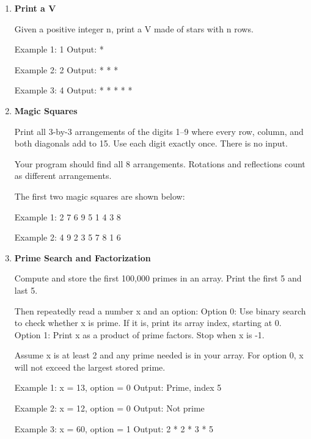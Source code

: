 \begin{enumerate}
\item \textbf{Print a V}

Given a positive integer n, print a V made of stars with n rows.

\begin{console}
Example 1: 1
Output:
*

Example 2: 2
Output:
*   *
  *
  
Example 3: 4
Output:
*     *
 *   *
   *
\end{console}\newpage

\item \textbf{Magic Squares}

Print all 3-by-3 arrangements of the digits 1–9 where every row, column, and both diagonals add to 15. Use each digit exactly once. There is no input.

Your program should find all 8 arrangements. Rotations and reflections count as different arrangements.

The first two magic squares are shown below:
\begin{console}
Example 1:
2 7 6
9 5 1
4 3 8

Example 2:
4 9 2
3 5 7
8 1 6
\end{console}\newpage

\item \textbf{Prime Search and Factorization}

Compute and store the first 100,000 primes in an array. Print the first 5 and last 5.

Then repeatedly read a number x and an option:
Option 0: Use binary search to check whether x is prime. If it is, print its array index, starting at 0.
Option 1: Print x as a product of prime factors.
Stop when x is -1.

Assume x is at least 2 and any prime needed is in your array. For option 0, x will not exceed the largest stored prime.

\begin{console}
Example 1: x = 13, option = 0
Output:    Prime, index 5

Example 2: x = 12, option = 0
Output:    Not prime

Example 3: x = 60, option = 1
Output:    2 * 2 * 3 * 5
\end{console}\newpage



\end{enumerate}
